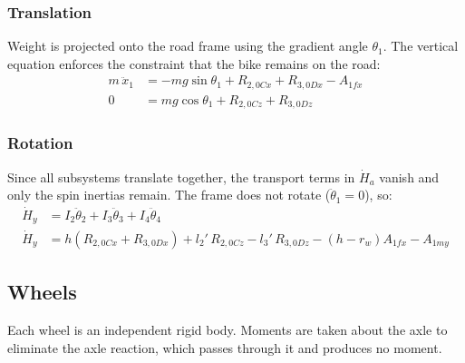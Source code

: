\documentclass[10pt]{extarticle}
\numberwithin{equation}{subsubsection}
\begin{document}
\subsubsection{Translation}

Weight is projected onto the road frame using the gradient angle $\theta_1$. The vertical equation enforces the constraint that the bike remains on the road:
\begin{align}
    m\,\ddot{x}_1 &= -mg\sin\theta_1 + R_{2,0Cx} + R_{3,0Dx} - A_{1fx} \\
    0               &= mg\cos\theta_1 + R_{2,0Cz} + R_{3,0Dz}
\end{align}

\subsubsection{Rotation}

Since all subsystems translate together, the transport terms in $\dot{H}_a$ vanish and only the spin inertias remain. The frame does not rotate ($\ddot{\theta}_1 = 0$), so:
\begin{align}
    \dot{H}_y &= I_2\ddot{\theta}_2 + I_3\ddot{\theta}_3 + I_4\ddot{\theta}_4 \\
    \dot{H}_y &= h\left(R_{2,0Cx} + R_{3,0Dx}\right) + l_2'\,R_{2,0Cz} - l_3'\,R_{3,0Dz}
               - \left(h - r_w\right)A_{1fx} - A_{1my}
\end{align}

\newpage
\subsection{Wheels}

Each wheel is an independent rigid body. Moments are taken about the axle to eliminate the axle reaction, which passes through it and produces no moment.
\end{document}
